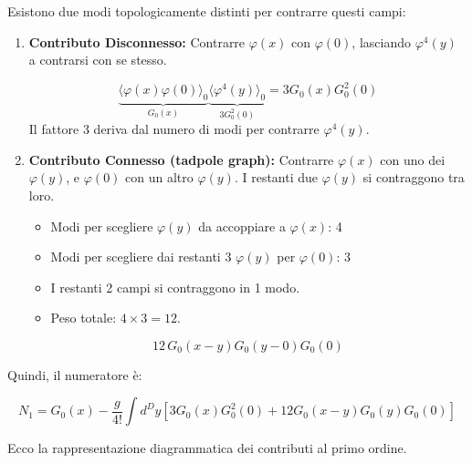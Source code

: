 Esistono due modi topologicamente distinti per contrarre questi campi:

\begin{enumerate}
    \item \textbf{Contributo Disconnesso:}
    Contrarre $\varphi(x)$ con $\varphi(0)$, lasciando $\varphi^4(y)$ a contrarsi con se stesso.
   
    \begin{equation}
        \underbrace{\langle \varphi(x)\varphi(0) \rangle_0}_{G_0(x)} \underbrace{\langle \varphi^4(y) \rangle_0}_{3 G_0^2(0)} = 3 G_0(x) G_0^2(0)
    \end{equation}
    Il fattore 3 deriva dal numero di modi per contrarre $\varphi^4(y)$.
   
    \item \textbf{Contributo Connesso (tadpole graph):}
    Contrarre $\varphi(x)$ con uno dei $\varphi(y)$, e $\varphi(0)$ con un altro $\varphi(y)$. I restanti due $\varphi(y)$ si contraggono tra loro.
   
    \begin{itemize}
        \item Modi per scegliere $\varphi(y)$ da accoppiare a $\varphi(x)$: 4
        \item Modi per scegliere dai restanti 3 $\varphi(y)$ per $\varphi(0)$: 3
        \item I restanti 2 campi si contraggono in 1 modo.
        \item Peso totale: $4 \times 3 = 12$.
    \end{itemize}
    \begin{equation}
        12 \, G_0(x-y) G_0(y-0) G_0(0)
    \end{equation}
\end{enumerate}

Quindi, il numeratore è:

\begin{equation}
    N_1 = G_0(x) - \frac{g}{4!} \int d^D y \left[ 3 G_0(x)G_0^2(0) + 12 G_0(x-y)G_0(y)G_0(0) \right]
\end{equation}

\noindent Ecco la rappresentazione diagrammatica dei contributi al primo ordine. 

